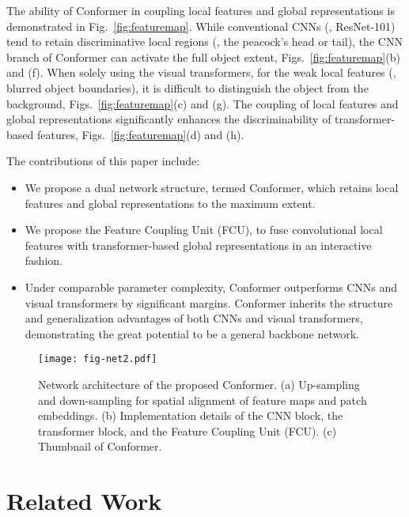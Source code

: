 \documentclass[10pt,twocolumn,letterpaper]{article}
\begin{document}
The ability of Conformer in coupling local features and global representations is demonstrated in Fig.~\ref{fig:featuremap}. While conventional CNNs (, ResNet-101) tend to retain discriminative local regions (, the peacock's head or tail), the CNN branch of Conformer can activate the full object extent, Figs.~\ref{fig:featuremap}(b) and (f). When solely using the visual transformers, for the weak local features (, blurred object boundaries), it is difficult to distinguish the object from the background, Figs.~\ref{fig:featuremap}(c) and (g). The coupling of local features and global representations significantly enhances the discriminability of transformer-based features, Figs.~\ref{fig:featuremap}(d) and (h).

The contributions of this paper include:
\begin{itemize}
    \item {We propose a dual network structure, termed Conformer, which retains local features and global representations to the maximum extent. }
    
    \item {We propose the Feature Coupling Unit (FCU), to fuse convolutional local features with transformer-based global representations in an interactive fashion. }

    \item Under comparable parameter complexity, Conformer outperforms CNNs and visual transformers by significant margins. Conformer inherits the structure and generalization advantages of both CNNs and visual transformers, demonstrating the great potential to be a general backbone network.
    
\end{itemize}

\begin{figure*}[!ht]
\begin{center}
\texttt{[image: fig-net2.pdf]}
\end{center}
\vspace{-1em}
\caption{Network architecture of the proposed  Conformer. (a) Up-sampling and down-sampling for spatial alignment of feature maps and patch embeddings. (b) Implementation details of the CNN block, the transformer block, and the Feature Coupling Unit (FCU). (c) Thumbnail of Conformer.}
\label{fig:net}
\end{figure*}

\section{Related Work}
\end{document}
